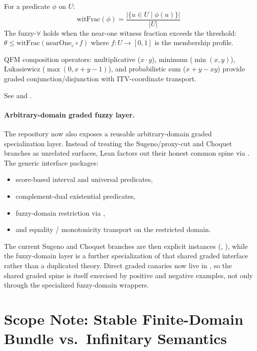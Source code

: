 \documentclass[11pt,openany]{report}
\begin{document}
\begin{definition}
For a predicate $\phi$ on $U$:
\[
  \mathrm{witFrac}(\phi) = \frac{|\{u \in U \mid \phi(u)\}|}{|U|}
\]
The fuzzy-$\forall$ holds when the near-one witness fraction exceeds
the threshold: $\theta \le \mathrm{witFrac}(\mathrm{nearOne}_\varepsilon \circ f)$
where $f : U \to [0,1]$ is the membership profile.
\end{definition}

QFM composition operators: multiplicative ($x \cdot y$), minimum
($\min(x,y)$), {\L}ukasiewicz ($\max(0, x+y-1)$), and probabilistic sum
($x + y - xy$) provide graded conjunction/disjunction with ITV-coordinate
transport.

See 
and .

\paragraph{Arbitrary-domain graded fuzzy layer.}
The repository now also exposes a reusable arbitrary-domain graded
specialization layer.  Instead of treating the Sugeno/proxy-cut and
Choquet branches as unrelated surfaces, Lean factors out their honest
common spine via
.
The generic interface  packages:
\begin{itemize}
\item score-based interval and universal predicates,
\item complement-dual existential predicates,
\item fuzzy-domain restriction via ,
\item and equality / monotonicity transport on the restricted domain.
\end{itemize}
The current Sugeno and Choquet branches are then explicit instances
(,
), while the fuzzy-domain layer is a
further specialization of that shared graded interface rather than a
duplicated theory.  Direct graded canaries now live in
, so the
shared graded spine is itself exercised by positive and negative examples,
not only through the specialized fuzzy-domain wrappers.

\section{Scope Note: Stable Finite-Domain Bundle vs.\ Infinitary Semantics}
\end{document}

